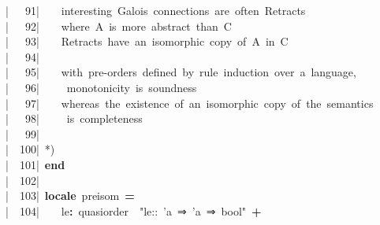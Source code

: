 \documentclass{article}
\newcommand{\syntaxCOMMENTA}[1]{\textcolor[rgb]{0.8,0.0,0.0}{#1}}
\newcommand{\syntaxKEYWORDA}[1]{\textcolor[rgb]{0.0,0.4,0.6}{\textbf{#1}}}
\newcommand{\syntaxKEYWORDB}[1]{\textcolor[rgb]{0.0,0.6,0.4}{\textbf{#1}}}
\newcommand{\syntaxLITERALA}[1]{\textcolor[rgb]{1.0,0.0,0.8}{#1}}
\newcommand{\syntaxOPERATOR}[1]{\textcolor[rgb]{0.0,0.0,0.0}{\textbf{#1}}}
\newcommand{\syntaxCOMMENTA}[1]{\textcolor[rgb]{0.8,0.0,0.0}{#1}}
\newcommand{\syntaxKEYWORDA}[1]{\textcolor[rgb]{0.0,0.4,0.6}{\textbf{#1}}}
\newcommand{\syntaxKEYWORDB}[1]{\textcolor[rgb]{0.0,0.6,0.4}{\textbf{#1}}}
\newcommand{\syntaxLITERALA}[1]{\textcolor[rgb]{1.0,0.0,0.8}{#1}}
\newcommand{\syntaxOPERATOR}[1]{\textcolor[rgb]{0.0,0.0,0.0}{\textbf{#1}}}
\newcommand{\syntaxCOMMENTA}[1]{\textcolor[rgb]{0.8,0.0,0.0}{#1}}
\newcommand{\syntaxKEYWORDA}[1]{\textcolor[rgb]{0.0,0.4,0.6}{\textbf{#1}}}
\newcommand{\syntaxKEYWORDB}[1]{\textcolor[rgb]{0.0,0.6,0.4}{\textbf{#1}}}
\newcommand{\syntaxLITERALA}[1]{\textcolor[rgb]{1.0,0.0,0.8}{#1}}
\newcommand{\syntaxOPERATOR}[1]{\textcolor[rgb]{0.0,0.0,0.0}{\textbf{#1}}}
\newcommand{\syntaxCOMMENTA}[1]{\textcolor[rgb]{0.8,0.0,0.0}{\textbf{#1}}}
\newcommand{\syntaxKEYWORDA}[1]{\textcolor[rgb]{0.0,0.4,0.6}{#1}}
\newcommand{\syntaxKEYWORDB}[1]{\textcolor[rgb]{0.0,0.6,0.4}{#1}}
\newcommand{\syntaxLITERALA}[1]{\textcolor[rgb]{1.0,0.0,0.8}{\textbf{#1}}}
\newcommand{\syntaxOPERATOR}[1]{\textcolor[rgb]{0.0,0.0,0.0}{#1}}
\newcommand{\syntaxCOMMENTA}[1]{\textcolor[rgb]{0.8,0.0,0.0}{#1}}
\newcommand{\syntaxKEYWORDA}[1]{\textcolor[rgb]{0.0,0.4,0.6}{\textbf{#1}}}
\newcommand{\syntaxKEYWORDB}[1]{\textcolor[rgb]{0.0,0.6,0.4}{\textbf{#1}}}
\newcommand{\syntaxLITERALA}[1]{\textcolor[rgb]{1.0,0.0,0.8}{#1}}
\newcommand{\syntaxOPERATOR}[1]{\textcolor[rgb]{0.0,0.0,0.0}{\textbf{#1}}}
\newcommand{\syntaxCOMMENTA}[1]{\textcolor[rgb]{0.8,0.0,0.0}{#1}}
\newcommand{\syntaxKEYWORDA}[1]{\textcolor[rgb]{0.0,0.4,0.6}{\textbf{#1}}}
\newcommand{\syntaxKEYWORDB}[1]{\textcolor[rgb]{0.0,0.6,0.4}{\textbf{#1}}}
\newcommand{\syntaxLITERALA}[1]{\textcolor[rgb]{1.0,0.0,0.8}{#1}}
\newcommand{\syntaxOPERATOR}[1]{\textcolor[rgb]{0.0,0.0,0.0}{\textbf{#1}}}
\newcommand{\syntaxCOMMENTA}[1]{\textcolor[rgb]{0.0,0.0,0.0}{#1}}
\newcommand{\syntaxKEYWORDA}[1]{\textcolor[rgb]{0.0,0.0,0.0}{#1}}
\newcommand{\syntaxKEYWORDB}[1]{\textcolor[rgb]{0.0,0.0,0.0}{#1}}
\newcommand{\gutter}[1]{\textcolor[rgb]{0,0,0}{{|}#1}}
\newcommand{\gutterH}[1]{\textcolor[rgb]{1,0,0}{{|}#1}}
\begin{document}
\gutter{\ \ \ 91{|}\ }\syntaxCOMMENTA{{\ }{\ }{\ }interesting{\ }Galois{\ }connections{\ }are{\ }often{\ }Retracts}\hspace*{\fill}\\
\gutter{\ \ \ 92{|}\ }\syntaxCOMMENTA{{\ }{\ }{\ }where{\ }A{\ }is{\ }more{\ }abstract{\ }than{\ }C}\hspace*{\fill}\\
\gutter{\ \ \ 93{|}\ }\syntaxCOMMENTA{{\ }{\ }{\ }Retracts{\ }have{\ }an{\ }isomorphic{\ }copy{\ }of{\ }A{\ }in{\ }C}\hspace*{\fill}\\
\gutter{\ \ \ 94{|}\ }\hspace*{\fill}\\
\gutterH{\ \ \ 95{|}\ }\syntaxCOMMENTA{{\ }{\ }{\ }with{\ }pre{-}orders{\ }defined{\ }by{\ }rule{\ }induction{\ }over{\ }a{\ }language,}\hspace*{\fill}\\
\gutter{\ \ \ 96{|}\ }\syntaxCOMMENTA{{\ }{\ }{\ }{\ }monotonicity{\ }is{\ }soundness{\ }}\hspace*{\fill}\\
\gutter{\ \ \ 97{|}\ }\syntaxCOMMENTA{{\ }{\ }{\ }whereas{\ }the{\ }existence{\ }of{\ }an{\ }isomorphic{\ }copy{\ }of{\ }the{\ }semantics{\ }}\hspace*{\fill}\\
\gutter{\ \ \ 98{|}\ }\syntaxCOMMENTA{{\ }{\ }{\ }{\ }is{\ }completeness}\hspace*{\fill}\\
\gutter{\ \ \ 99{|}\ }\syntaxCOMMENTA{{\ }{\ }{\ }{\ }{\ }{\ }{\ }{\ }{\ }{\ }{\ }{\ }{\ }{\ }{\ }{\ }{\ }{\ }{\ }{\ }{\ }{\ }{\ }{\ }{\ }{\ }{\ }{\ }{\ }{\ }{\ }{\ }{\ }{\ }{\ }{\ }{\ }{\ }{\ }{\ }{\ }{\ }{\ }{\ }{\ }{\ }{\ }{\ }{\ }{\ }{\ }}\hspace*{\fill}\\
\gutterH{\ \ 100{|}\ }\syntaxCOMMENTA{*)}\hspace*{\fill}\\
\gutter{\ \ 101{|}\ }\syntaxKEYWORDB{end}\hspace*{\fill}\\
\gutter{\ \ 102{|}\ }\hspace*{\fill}\\
\gutter{\ \ 103{|}\ }\syntaxKEYWORDA{locale}{\ }pre\usebox{\underscorebox}isom{\ }\syntaxOPERATOR{=}{\ }\hspace*{\fill}\\
\gutter{\ \ 104{|}\ }{\ }{\ }{\ }le\syntaxOPERATOR{:}{\ }quasi\usebox{\underscorebox}order{\ }{\ }\syntaxLITERALA{"le::{\ }'a{\ }⇒{\ }'a{\ }⇒{\ }bool"}{\ }\syntaxOPERATOR{+}{\ }\hspace*{\fill}\\
\end{document}
